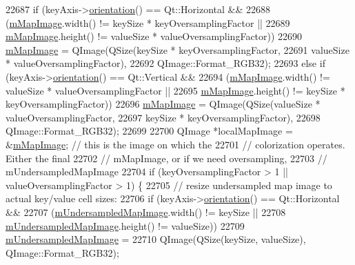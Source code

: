 \begin{DoxyCode}
22687   \textcolor{keywordflow}{if} (keyAxis->\hyperlink{class_q_c_p_axis_a57483f2f60145ddc9e63f3af53959265}{orientation}() == Qt::Horizontal &&
22688       (\hyperlink{class_q_c_p_color_map_a66110813b42eca78b64095b2a1f285a0}{mMapImage}.width() != keySize * keyOversamplingFactor ||
22689        \hyperlink{class_q_c_p_color_map_a66110813b42eca78b64095b2a1f285a0}{mMapImage}.height() != valueSize * valueOversamplingFactor))
22690     \hyperlink{class_q_c_p_color_map_a66110813b42eca78b64095b2a1f285a0}{mMapImage} = QImage(QSize(keySize * keyOversamplingFactor,
22691                              valueSize * valueOversamplingFactor),
22692                        QImage::Format\_RGB32);
22693   \textcolor{keywordflow}{else} \textcolor{keywordflow}{if} (keyAxis->\hyperlink{class_q_c_p_axis_a57483f2f60145ddc9e63f3af53959265}{orientation}() == Qt::Vertical &&
22694            (\hyperlink{class_q_c_p_color_map_a66110813b42eca78b64095b2a1f285a0}{mMapImage}.width() != valueSize * valueOversamplingFactor ||
22695             \hyperlink{class_q_c_p_color_map_a66110813b42eca78b64095b2a1f285a0}{mMapImage}.height() != keySize * keyOversamplingFactor))
22696     \hyperlink{class_q_c_p_color_map_a66110813b42eca78b64095b2a1f285a0}{mMapImage} = QImage(QSize(valueSize * valueOversamplingFactor,
22697                              keySize * keyOversamplingFactor),
22698                        QImage::Format\_RGB32);
22699 
22700   QImage *localMapImage = &\hyperlink{class_q_c_p_color_map_a66110813b42eca78b64095b2a1f285a0}{mMapImage}; \textcolor{comment}{// this is the image on which the}
22701                                       \textcolor{comment}{// colorization operates. Either the final}
22702                                       \textcolor{comment}{// mMapImage, or if we need oversampling,}
22703                                       \textcolor{comment}{// mUndersampledMapImage}
22704   \textcolor{keywordflow}{if} (keyOversamplingFactor > 1 || valueOversamplingFactor > 1) \{
22705     \textcolor{comment}{// resize undersampled map image to actual key/value cell sizes:}
22706     \textcolor{keywordflow}{if} (keyAxis->\hyperlink{class_q_c_p_axis_a57483f2f60145ddc9e63f3af53959265}{orientation}() == Qt::Horizontal &&
22707         (\hyperlink{class_q_c_p_color_map_acad3d52f3572436d5f2e4057911ea8d3}{mUndersampledMapImage}.width() != keySize ||
22708          \hyperlink{class_q_c_p_color_map_acad3d52f3572436d5f2e4057911ea8d3}{mUndersampledMapImage}.height() != valueSize))
22709       \hyperlink{class_q_c_p_color_map_acad3d52f3572436d5f2e4057911ea8d3}{mUndersampledMapImage} =
22710           QImage(QSize(keySize, valueSize), QImage::Format\_RGB32);

\end{DoxyCode}
